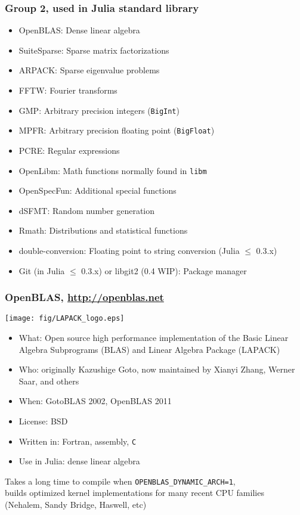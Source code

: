 \documentclass[compressed,dvips,letter]{beamer}
\begin{document}
%
%

\begin{frame}\frametitle{Group 2, used in Julia standard library}
\begin{itemize}
\item OpenBLAS: Dense linear algebra
\item SuiteSparse: Sparse matrix factorizations
\item ARPACK: Sparse eigenvalue problems
\item FFTW: Fourier transforms
\item GMP: Arbitrary precision integers (\texttt{BigInt})
\item MPFR: Arbitrary precision floating point (\texttt{BigFloat})
\item PCRE: Regular expressions
\item OpenLibm: Math functions normally found in \texttt{libm}
\item OpenSpecFun: Additional special functions
\item dSFMT: Random number generation
\item Rmath: Distributions and statistical functions
\item double-conversion: Floating point to string conversion (Julia $\leq$ 0.3.x)
\item Git (in Julia $\leq$ 0.3.x) or libgit2 (0.4 WIP): Package manager
\end{itemize}
\end{frame}

%
%

\begin{frame}\frametitle{OpenBLAS, \url{http://openblas.net}}

\begin{minipage}{0.3\textwidth}
\texttt{[image: fig/LAPACK\_logo.eps]}
\end{minipage} \begin{minipage}{0.68\textwidth}
\begin{itemize}
\item What: Open source high performance implementation of the Basic Linear Algebra Subprograms (BLAS) and Linear Algebra Package (LAPACK)
\item Who: originally Kazushige Goto, now maintained by Xianyi Zhang, Werner Saar, and others
\item When: GotoBLAS 2002, OpenBLAS 2011
\item License: BSD
\item Written in: Fortran, assembly, \texttt{C}
\item Use in Julia: dense linear algebra
\end{itemize}
\end{minipage}

\vspace{15pt}
Takes a long time to compile when \texttt{OPENBLAS\_DYNAMIC\_ARCH=1}, \\
builds optimized kernel implementations for many recent CPU families \\
(Nehalem, Sandy Bridge, Haswell, etc)

\end{frame}
\end{document}
